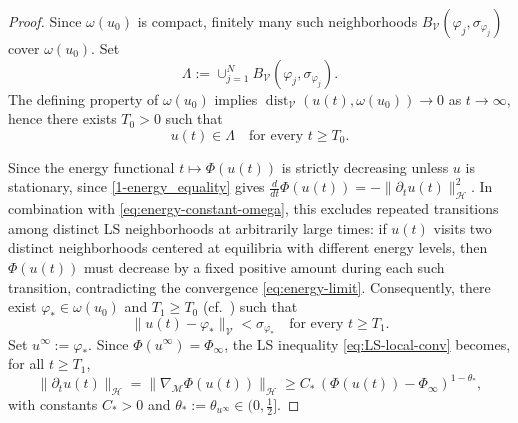 \documentclass[reqno]{amsart}
\begin{document}
\begin{proof}
Since $\omega(u_0)$ is compact, finitely many such neighborhoods
$B_{\mathcal V}(\varphi_j,\sigma_{\varphi_j})$ cover $\omega(u_0)$. Set
\[
\Lambda:=\cup_{j=1}^N B_{\mathcal V}(\varphi_j,\sigma_{\varphi_j}).
\]
The defining property of $\omega(u_0)$ implies
$\operatorname{dist}_{\mathcal V}(u(t),\omega(u_0))\to 0$ as $t\to\infty$, hence
there exists $T_0>0$ such that
\begin{equation}\label{eq:eventually-in-Lambda}
u(t)\in\Lambda\quad\text{for every }t\ge T_0.
\end{equation}

Since the energy functional $t\mapsto \Phi(u(t))$ is strictly decreasing unless $u$
is stationary, since \eqref{1-energy_equality} gives
$\frac{d}{dt}\Phi(u(t))=-\|\partial_t u(t)\|_{\mathcal H}^2$.
In combination with \eqref{eq:energy-constant-omega}, this excludes repeated transitions
among distinct LS neighborhoods at arbitrarily large times: if $u(t)$ visits two
distinct neighborhoods centered at equilibria with different energy levels,
then $\Phi(u(t))$ must decrease by a fixed
positive amount during each such transition, contradicting the convergence
\eqref{eq:energy-limit}.
Consequently, there exist $\varphi_*\in\omega(u_0)$ and $T_1\ge T_0$
(cf.~\cite{Hale,Jendoubi}) such that
\begin{equation}\label{eq:eventually-in-one-neighborhood}
\|u(t)-\varphi_*\|_{\mathcal V}<\sigma_{\varphi_*}\quad\text{for every }t\ge T_1.
\end{equation}
Set $u^\infty:=\varphi_*$. Since $\Phi(u^\infty)=\Phi_\infty$, the LS inequality
\eqref{eq:LS-local-conv} becomes, for all $t\ge T_1$,
\begin{equation}\label{eq:LS-along-trajectory}
\|\partial_t u(t)\|_{\mathcal H}
=\|\nabla_{\!\mathcal M}\Phi(u(t))\|_{\mathcal H}
\ge C_{*}\,(\Phi(u(t))-\Phi_\infty)^{1-\theta_*},
\end{equation}
with constants $C_*>0$ and $\theta_*:=\theta_{u^\infty}\in(0,\tfrac12]$.


\end{proof}
\end{document}
